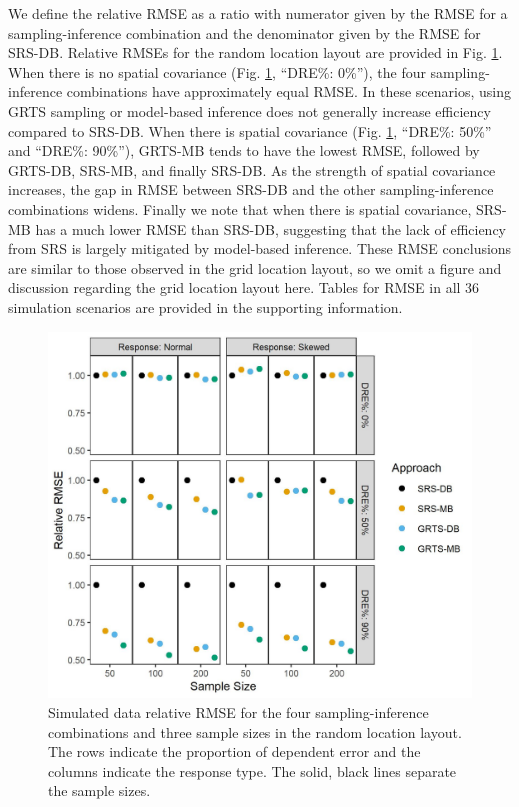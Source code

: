 \documentclass[]{elsarticle} %
\begin{document}
We define the relative RMSE as a ratio with numerator given by the RMSE
for a sampling-inference combination and the denominator given by the
RMSE for SRS-DB. Relative RMSEs for the random location layout are
provided in Fig. \ref{fig:rmspe_eff}. When there is no spatial
covariance (Fig. \ref{fig:rmspe_eff}, ``DRE\%: 0\%''), the four
sampling-inference combinations have approximately equal RMSE. In these
scenarios, using GRTS sampling or model-based inference does not
generally increase efficiency compared to SRS-DB. When there is spatial
covariance (Fig. \ref{fig:rmspe_eff}, ``DRE\%: 50\%'' and ``DRE\%:
90\%''), GRTS-MB tends to have the lowest RMSE, followed by GRTS-DB,
SRS-MB, and finally SRS-DB. As the strength of spatial covariance
increases, the gap in RMSE between SRS-DB and the other
sampling-inference combinations widens. Finally we note that when there
is spatial covariance, SRS-MB has a much lower RMSE than SRS-DB,
suggesting that the lack of efficiency from SRS is largely mitigated by
model-based inference. These RMSE conclusions are similar to those
observed in the grid location layout, so we omit a figure and discussion
regarding the grid location layout here. Tables for RMSE in all 36
simulation scenarios are provided in the supporting information.

\begin{figure}
  \centering
  \includegraphics[width = 1\linewidth]{figures/rmspe_eff.jpeg}
  \caption{Simulated data relative RMSE for the four sampling-inference combinations and three sample sizes in the random location layout. The rows indicate the proportion of dependent error and the columns indicate the response type. The solid, black lines separate the sample sizes.}
  \label{fig:rmspe_eff}
\end{figure}
\end{document}
